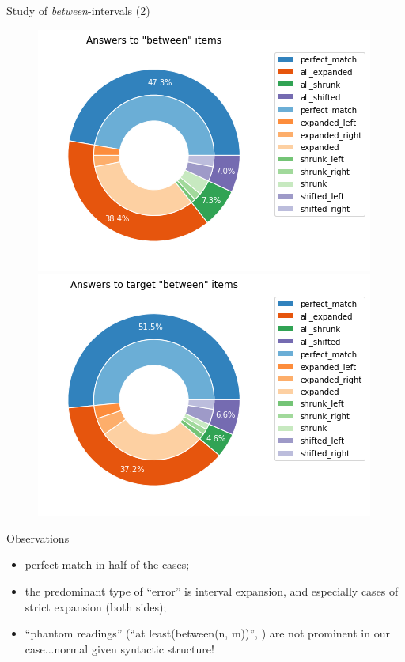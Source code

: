 \documentclass[xcolor=table, hyperref={pdfpagelabels=false}]{beamer}
\begin{document}
\begin{frame}{Study of \textit{between}-intervals (2)}
\begin{figure}
	\includegraphics[width=.45\textwidth]{./images/between_items_int.png}
	\includegraphics[width=.45\textwidth]{./images/target_between_items_int.png}
\end{figure}
\vspace{-5mm}
\begin{block}{Observations}
	\begin{itemize}
		\item perfect match in half of the cases;
		\item the predominant type of ``error'' is interval expansion, and especially cases of strict expansion (both sides);
		\item ``phantom readings'' (``at least(between(n, m))'', \cite{Marty2014}) are not prominent in our case...normal given syntactic structure!
	\end{itemize}
\end{block}
\end{frame}
\end{document}
